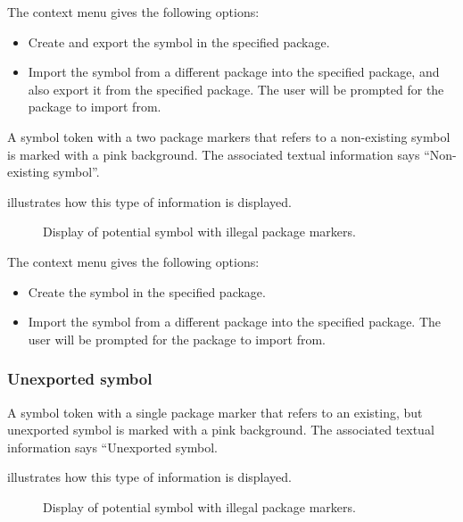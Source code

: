 The context menu gives the following options:

\begin{itemize}
\item Create and export the symbol in the specified package.
\item Import the symbol from a different package into the specified
  package, and also export it from the specified package.  The user
  will be prompted for the package to import from.
\end{itemize}

A symbol token with a two package markers that refers to a
non-existing symbol is marked with a pink background.  The
associated textual information says ``Non-existing symbol''.  

 illustrates how
this type of information is displayed.

\begin{figure}
\begin{center}
\end{center}
\caption{\label{fig-non-existing-symbol-two-package-markers}
Display of potential symbol with illegal package markers.}
\end{figure}

The context menu gives the following options:

\begin{itemize}
\item Create the symbol in the specified package.
\item Import the symbol from a different package into the specified
  package.  The user will be prompted for the package to import from.
\end{itemize}

\subsubsection{Unexported symbol}

A symbol token with a single package marker that refers to an
existing, but unexported symbol is marked with a pink background.  The
associated textual information says ``Unexported symbol.

 illustrates how this type of
information is displayed.

\begin{figure}
\begin{center}
\end{center}
\caption{\label{fig-unexported-symbol}
Display of potential symbol with illegal package markers.}
\end{figure}

